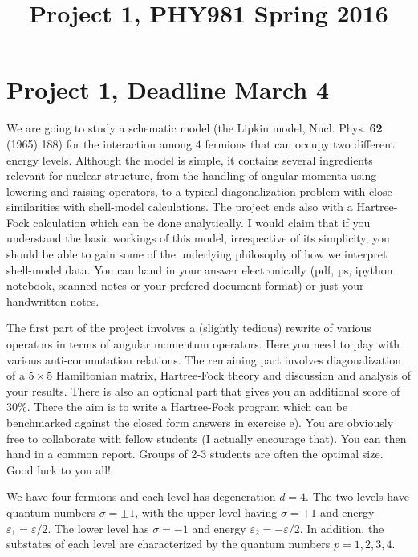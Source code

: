 \documentclass[11pt,a4wide]{article}
\begin{document}
\title{Project 1,  PHY981 Spring 2016}
\maketitle
\section*{Project 1, Deadline March 4}


We are going to study a schematic model (the Lipkin model, Nucl.
Phys. {\bf 62} (1965) 188) for the interaction among $4$ fermions that
can occupy two different energy levels.  Although the model is simple,
it contains several ingredients relevant for nuclear structure, from
the handling of angular momenta using lowering and raising operators,
to a typical diagonalization problem with close similarities with
shell-model calculations. The project ends also with a Hartree-Fock
calculation which can be done analytically.  I would claim that if you understand the basic workings
of this model, irrespective of its simplicity, you should be able to
gain some of the underlying philosophy of how we interpret shell-model
data.  You can hand in your answer electronically (pdf, ps, ipython notebook, scanned
notes or your prefered document format) or just your handwritten notes.

The first part of the project involves a (slightly tedious) rewrite of various operators in terms of angular momentum 
operators. Here you need to play with various anti-commutation relations. The remaining part involves diagonalization of a $5\times 5$ Hamiltonian matrix, Hartree-Fock theory and discussion and analysis of your results.
There is also an optional part that gives you an additional score of 30\%. There the aim is to write a Hartree-Fock program which can be benchmarked against the closed form answers in exercise e). 
You are obviously free to collaborate with fellow students (I actually encourage that).  You can then hand in a common report. Groups of 2-3 students are often the optimal size. Good luck to you all! 

We have four fermions and 
each level has degeneration $d=4$. The two levels have quantum numbers $\sigma=\pm 1$,
with the upper level having  $\sigma=+1$ and energy
$\varepsilon_{1}=
\varepsilon/2$. The lower level  has $\sigma=-1$ and energy
$\varepsilon_{2}=-\varepsilon/2$. 
In addition, the substates  of each level are characterized  
by the quantum numbers $p=1,2,3,4$.  
\end{document}
